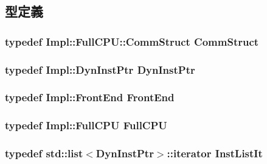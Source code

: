 \subsection{型定義}
\hypertarget{classInorderBackEnd_a82fb3c7183ba777a05c510ab2fbcfb82}{
\subsubsection[{CommStruct}]{\setlength{\rightskip}{0pt plus 5cm}typedef Impl::FullCPU::CommStruct {\bf CommStruct}}}
\label{classInorderBackEnd_a82fb3c7183ba777a05c510ab2fbcfb82}
\hypertarget{classInorderBackEnd_a028ce10889c5f6450239d9e9a7347976}{
\subsubsection[{DynInstPtr}]{\setlength{\rightskip}{0pt plus 5cm}typedef Impl::DynInstPtr {\bf DynInstPtr}}}
\label{classInorderBackEnd_a028ce10889c5f6450239d9e9a7347976}
\hypertarget{classInorderBackEnd_abe8e1d8243582d5024a1076f6091d9fe}{
\subsubsection[{FrontEnd}]{\setlength{\rightskip}{0pt plus 5cm}typedef Impl::FrontEnd {\bf FrontEnd}}}
\label{classInorderBackEnd_abe8e1d8243582d5024a1076f6091d9fe}
\hypertarget{classInorderBackEnd_a90ba84e54618cc07f2e8f05e046cb5ce}{
\subsubsection[{FullCPU}]{\setlength{\rightskip}{0pt plus 5cm}typedef Impl::FullCPU {\bf FullCPU}}}
\label{classInorderBackEnd_a90ba84e54618cc07f2e8f05e046cb5ce}
\hypertarget{classInorderBackEnd_a4da46d72d68fcd5bfe65dc701c358379}{
\subsubsection[{InstListIt}]{\setlength{\rightskip}{0pt plus 5cm}typedef {\bf std::list}$<${\bf DynInstPtr}$>$::iterator {\bf InstListIt}}}
